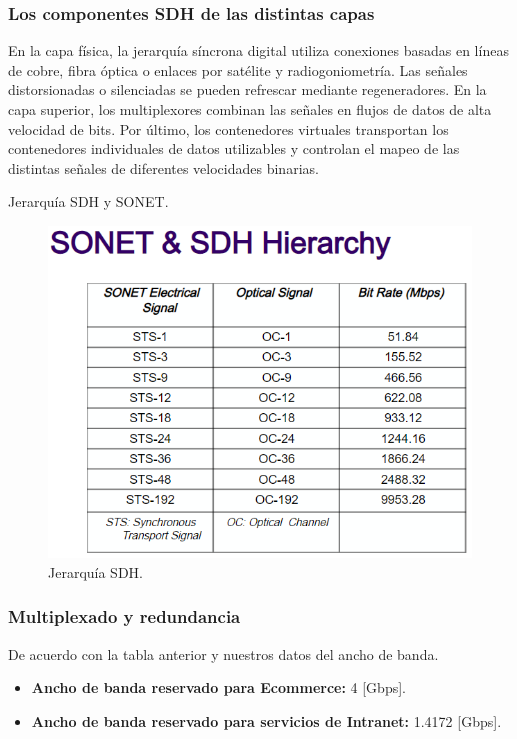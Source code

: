 \documentclass[12pt,letterpaper]{article}
\begin{document}
\subsubsection{Los componentes SDH de las distintas capas}
En la capa física, la jerarquía síncrona digital utiliza conexiones basadas en líneas de 
cobre, fibra óptica o enlaces por satélite y radiogoniometría. Las señales distorsionadas 
o silenciadas se pueden refrescar mediante regeneradores. En la capa superior, los 
multiplexores combinan las señales en flujos de datos de alta velocidad de bits. Por 
último, los contenedores virtuales transportan los contenedores individuales de datos 
utilizables y controlan el mapeo de las distintas señales de diferentes velocidades binarias.

\newpage
Jerarquía SDH y SONET.
\begin{figure}[ht]
    \centering
    \includegraphics[width=.8\textwidth]{imagenes/sdhj1.png}
    \caption{Jerarquía SDH.}
\end{figure}

\subsubsection{Multiplexado y redundancia}
De acuerdo con la tabla anterior y nuestros datos del ancho de banda.
\begin{itemize}
    \item \textbf{Ancho de banda reservado para Ecommerce: } 4 [Gbps].
    \item \textbf{Ancho de banda reservado para servicios de Intranet: } 1.4172 [Gbps].
\end{itemize}
\end{document}
